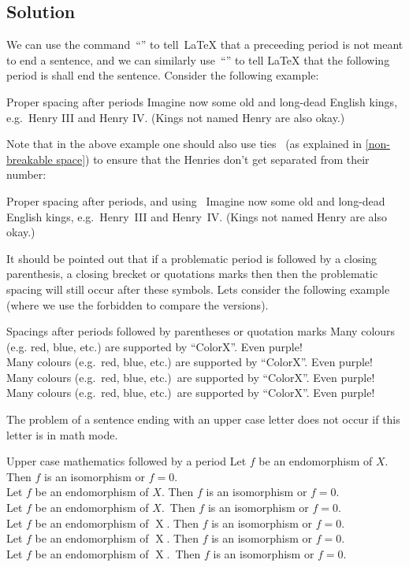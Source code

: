 \subsection{Solution}

We can use the command~\enquote{\commandname{ }} to tell~{\LaTeX} that a preceeding period is not meant to end a sentence, and we can similarly use~\enquote{} to tell {\LaTeX} that the following period is shall end the sentence.
Consider the following example:
\begin{showlatex}{Proper spacing after periods}
Imagine now some old and long-dead English kings, e.g.\ Henry III and Henry IV\@.
(Kings not named Henry are also okay.)
\end{showlatex}
Note that in the above example one should also use ties~\inlinecode{\customtexttilde} (as explained in \cref{non-breakable space}) to ensure that the Henries don’t get separated from their number:
\begin{showlatex}{Proper spacing after periods, and using~\inlinecode{\customtexttilde}}
Imagine now some old and long-dead English kings, e.g.\ Henry~III and Henry~IV\@.
(Kings not named Henry are also okay.)
\end{showlatex}

It should be pointed out that if a problematic period is followed by a closing parenthesis, a closing brecket or quotations marks then then the problematic spacing will still occur after these symbols.
Lets consider the following example (where we use the forbidden \commandname{\tbs} to compare the versions).
\begin{showlatex}{Spacings after periods followed by parentheses or quotation marks}
Many colours (e.g. red, blue, etc.) are supported by \enquote{ColorX}. Even purple! \\
Many colours (e.g.\ red, blue, etc.) are supported by \enquote{ColorX}. Even purple! \\
Many colours (e.g.\ red, blue, etc.)\ are supported by \enquote{ColorX}. Even purple! \\
Many colours (e.g.\ red, blue, etc.)\ are supported by \enquote{ColorX}\@. Even purple!
\end{showlatex}

The problem of a sentence ending with an upper case letter does not occur if this letter is in math mode.
\begin{showlatex}{Upper case mathematics followed by a period}
Let $f$ be an endomorphism of $X$.
Then $f$ is an isomorphism or $f = 0$.\\
Let $f$ be an endomorphism of $X$\@.
Then $f$ is an isomorphism or $f = 0$.\\
Let $f$ be an endomorphism of $X$.\ 
Then $f$ is an isomorphism or $f = 0$.
\\
Let $f$ be an endomorphism of $\operatorname{X}$.
Then $f$ is an isomorphism or $f = 0$.\\
Let $f$ be an endomorphism of $\operatorname{X}$\@.
Then $f$ is an isomorphism or $f = 0$.\\
Let $f$ be an endomorphism of $\operatorname{X}$.\ 
Then $f$ is an isomorphism or $f = 0$.
\end{showlatex}

